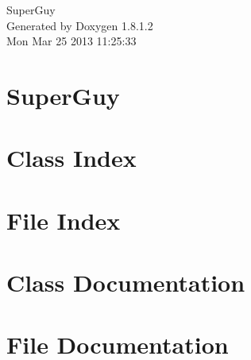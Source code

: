 \documentclass{book}
\begin{document}
\hypersetup{pageanchor=false,citecolor=blue}
\begin{titlepage}
\vspace*{7cm}
\begin{center}
{\Large Super\-Guy }\\
\vspace*{1cm}
{\large Generated by Doxygen 1.8.1.2}\\
\vspace*{0.5cm}
{\small Mon Mar 25 2013 11:25:33}\\
\end{center}
\end{titlepage}
\clearemptydoublepage
{}
\tableofcontents
\clearemptydoublepage
{}
\hypersetup{pageanchor=true,citecolor=blue}
\chapter{Super\-Guy}
\label{index}\hypertarget{index}{}
\chapter{Class Index}

\chapter{File Index}

\chapter{Class Documentation}









\chapter{File Documentation}



















\printindex
\end{document}
